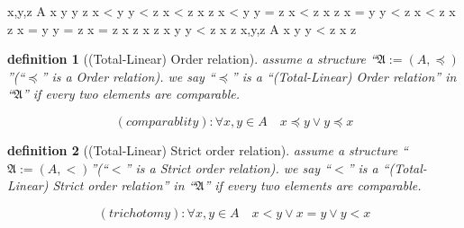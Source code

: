 \documentclass[10pt,a4paper]{book}
\newtheorem{definition}{definition}[section]
\begin{document}
\begin{fitchproof}[arrayenv=tabular]
    \open
     { x,y,z \in A }     
    \open
     { x \preceq y \land y \preceq z }      
    \open
     { x < y \land y < z }          
     { x < z }                           
     { x \preceq z }                         
    \close
    \open
     { x < y \land y = z }        
     { x < z }                     
     { x \preceq z }                   
    \close
    \open
     { x = y \land y < z }             
     { x < z }                           
     { x \preceq z }                           
    \close
    \open
     { x = y \land y = z }          
     { x = z }                        
     { x \preceq z }                   
    \close
     {x \preceq z  }                   
    \close
     { x \preceq y \land y < z \to x \preceq z }           
    \close
     {\forall x,y,z \in A \quad x \preceq y \land y < z \to x \preceq z } 
\end{fitchproof}



\begin{definition}[(Total-Linear) Order relation]
    assume  a structure ``$\mathfrak{A} := (A , \preceq  ) $''(``$\preceq $'' is a Order relation).
    we say ``$\preceq  $''
    is a ``(Total-Linear) Order relation'' in  ``$\mathfrak{A}$'' if every two elements are comparable.

    \[ (comparablity) :   \forall x,y \in A \quad x \preceq y \lor y \preceq x  \]

\end{definition}

\begin{definition}[(Total-Linear) Strict order relation]
     assume  a structure ``$\mathfrak{A} := (A , <  ) $''(``$< $'' is a Strict order relation).
    we say ``$<  $''
    is a ``(Total-Linear) Strict order relation'' in  ``$\mathfrak{A}$'' if every two elements are comparable.

    \[ (trichotomy) :   \forall x,y \in A \quad x < y \lor x=y \lor y < x \]

\end{definition}
\end{document}
